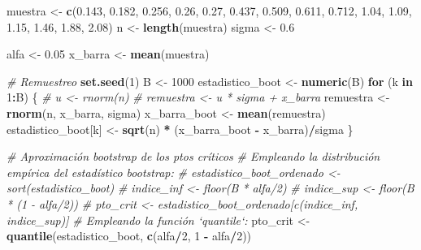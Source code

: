 \documentclass[]{book}
\newenvironment{Shaded}{\begin{snugshade}}{\end{snugshade}}
\newcommand{\KeywordTok}[1]{\textcolor[rgb]{0.13,0.29,0.53}{\textbf{#1}}}
\newcommand{\DecValTok}[1]{\textcolor[rgb]{0.00,0.00,0.81}{#1}}
\newcommand{\FloatTok}[1]{\textcolor[rgb]{0.00,0.00,0.81}{#1}}
\newcommand{\StringTok}[1]{\textcolor[rgb]{0.31,0.60,0.02}{#1}}
\newcommand{\CommentTok}[1]{\textcolor[rgb]{0.56,0.35,0.01}{\textit{#1}}}
\newcommand{\ControlFlowTok}[1]{\textcolor[rgb]{0.13,0.29,0.53}{\textbf{#1}}}
\newcommand{\OperatorTok}[1]{\textcolor[rgb]{0.81,0.36,0.00}{\textbf{#1}}}
\newcommand{\NormalTok}[1]{#1}
\theoremstyle{definition}
\theoremstyle{definition}
\theoremstyle{definition}
\theoremstyle{remark}
\begin{document}
\begin{Shaded}
\begin{Highlighting}[]
\NormalTok{muestra <-}\StringTok{ }\KeywordTok{c}\NormalTok{(}\FloatTok{0.143}\NormalTok{, }\FloatTok{0.182}\NormalTok{, }\FloatTok{0.256}\NormalTok{, }\FloatTok{0.26}\NormalTok{, }\FloatTok{0.27}\NormalTok{, }\FloatTok{0.437}\NormalTok{, }\FloatTok{0.509}\NormalTok{, }
             \FloatTok{0.611}\NormalTok{, }\FloatTok{0.712}\NormalTok{, }\FloatTok{1.04}\NormalTok{, }\FloatTok{1.09}\NormalTok{, }\FloatTok{1.15}\NormalTok{, }\FloatTok{1.46}\NormalTok{, }\FloatTok{1.88}\NormalTok{, }\FloatTok{2.08}\NormalTok{)}
\NormalTok{n <-}\StringTok{ }\KeywordTok{length}\NormalTok{(muestra)}
\NormalTok{sigma <-}\StringTok{ }\FloatTok{0.6}

\NormalTok{alfa <-}\StringTok{ }\FloatTok{0.05}
\NormalTok{x_barra <-}\StringTok{ }\KeywordTok{mean}\NormalTok{(muestra)}

\CommentTok{# Remuestreo}
\KeywordTok{set.seed}\NormalTok{(}\DecValTok{1}\NormalTok{)}
\NormalTok{B <-}\StringTok{ }\DecValTok{1000}
\NormalTok{estadistico_boot <-}\StringTok{ }\KeywordTok{numeric}\NormalTok{(B)}
\ControlFlowTok{for}\NormalTok{ (k }\ControlFlowTok{in} \DecValTok{1}\OperatorTok{:}\NormalTok{B) \{}
    \CommentTok{# u <- rnorm(n)}
    \CommentTok{# remuestra <- u * sigma + x_barra}
\NormalTok{    remuestra <-}\StringTok{ }\KeywordTok{rnorm}\NormalTok{(n, x_barra, sigma)}
\NormalTok{    x_barra_boot <-}\StringTok{ }\KeywordTok{mean}\NormalTok{(remuestra)}
\NormalTok{    estadistico_boot[k] <-}\StringTok{ }\KeywordTok{sqrt}\NormalTok{(n) }\OperatorTok{*}\StringTok{ }\NormalTok{(x_barra_boot }\OperatorTok{-}\StringTok{ }\NormalTok{x_barra)}\OperatorTok{/}\NormalTok{sigma}
\NormalTok{\}}

\CommentTok{# Aproximación bootstrap de los ptos críticos}
\CommentTok{# Empleando la distribución empírica del estadístico bootstrap: }
    \CommentTok{# estadistico_boot_ordenado <- sort(estadistico_boot)}
    \CommentTok{# indice_inf <- floor(B * alfa/2)}
    \CommentTok{# indice_sup <- floor(B * (1 - alfa/2))}
    \CommentTok{# pto_crit <- estadistico_boot_ordenado[c(indice_inf, indice_sup)]}
\CommentTok{# Empleando la función `quantile`:}
\NormalTok{pto_crit <-}\StringTok{ }\KeywordTok{quantile}\NormalTok{(estadistico_boot, }\KeywordTok{c}\NormalTok{(alfa}\OperatorTok{/}\DecValTok{2}\NormalTok{, }\DecValTok{1} \OperatorTok{-}\StringTok{ }\NormalTok{alfa}\OperatorTok{/}\DecValTok{2}\NormalTok{))}


\end{Highlighting}
\end{Shaded}
\end{document}
